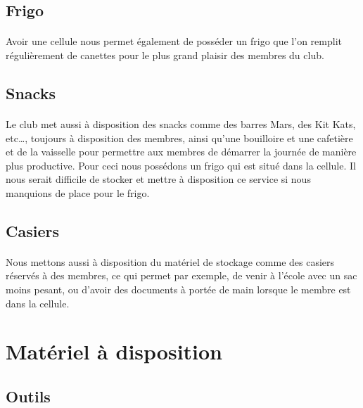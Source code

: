 \documentclass[11pt]{report}
\begin{document}
\subsection{Frigo}

\paragraph{} Avoir une cellule nous permet également de posséder un frigo que
l'on remplit régulièrement de canettes pour le plus grand plaisir des membres
du club.

\subsection{Snacks}

\paragraph{} Le club met aussi à disposition des snacks comme des barres Mars,
des Kit Kats, etc\ldots, toujours à disposition des membres, ainsi qu'une
bouilloire et une cafetière et de la vaisselle pour permettre aux membres de
démarrer la journée de manière plus productive. Pour ceci nous possédons un
frigo qui est situé dans la cellule. Il nous serait difficile de stocker et
mettre à disposition ce service si nous manquions de place pour le frigo.

\subsection{Casiers}

\paragraph{} Nous mettons aussi à disposition du matériel de stockage comme des
casiers réservés à des membres, ce qui permet par exemple, de venir à l'école
avec un sac moins pesant, ou d'avoir des documents à portée de main lorsque le
membre est dans la cellule.

\section{Matériel à disposition}

\subsection{Outils}
\end{document}

